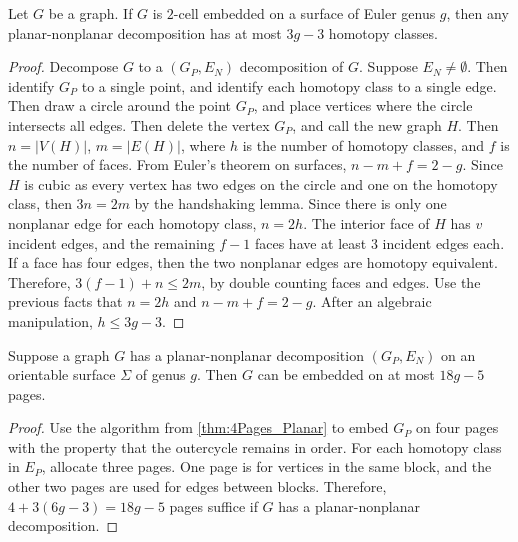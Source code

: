 \begin{lemma}
	Let $G$ be a graph. If \(G\) is \(2\)-cell embedded on a surface of Euler genus \(g\), then any planar-nonplanar decomposition has at most \(3g-3\) homotopy classes. 
\end{lemma}
\begin{proof}
	Decompose \(G\) to a \((G_P, E_N)\) decomposition of \(G\). Suppose \(E_N \neq \emptyset\). Then identify \(G_P\) to a single point, and identify each homotopy class to a single edge. Then draw a circle around the point \(G_P\), and place vertices where the circle intersects all edges. Then delete the vertex \(G_P\), and call the new graph \(H\). Then \(n = |V(H)|\), \(m = |E(H)|\), where \(h\) is the number of homotopy classes, and \(f\) is the number of faces. From Euler's theorem on surfaces, \(n - m + f = 2 - g\). Since \(H\) is cubic as every vertex has two edges on the circle and one on the homotopy class, then \(3n = 2m\) by the handshaking lemma. Since there is only one nonplanar edge for each homotopy class, \(n = 2h\). The interior face of \(H\) has \(v\) incident edges, and the remaining \(f-1\) faces have at least 3 incident edges each. If a face has four edges, then the two nonplanar edges are homotopy equivalent. Therefore, \(3(f-1) + n \leq 2m\), by double counting faces and edges. Use the previous facts that $n = 2h$ and $n - m + f = 2 - g$. After an algebraic manipulation, \(h \leq 3g - 3 \). 
\end{proof}

\begin{lemma}\label{lem:planar_nonplanar_orientable}
	Suppose a graph \(G\) has a planar-nonplanar decomposition \((G_P, E_N)\) on an orientable surface \(\Sigma\) of genus $g$. Then \(G\) can be embedded on at most \(18g - 5\) pages.
\end{lemma}
\begin{proof}
	Use the algorithm from \cref{thm:4Pages_Planar} to embed $G_P$ on four pages with the property that the outercycle remains in order. For each homotopy class in \(E_P\), allocate three pages. One page is for vertices in the same block, and the other two pages are used for edges between blocks. Therefore, \(4 + 3(6g - 3) = 18g-5\) pages suffice if \(G\) has a planar-nonplanar decomposition.
\end{proof}